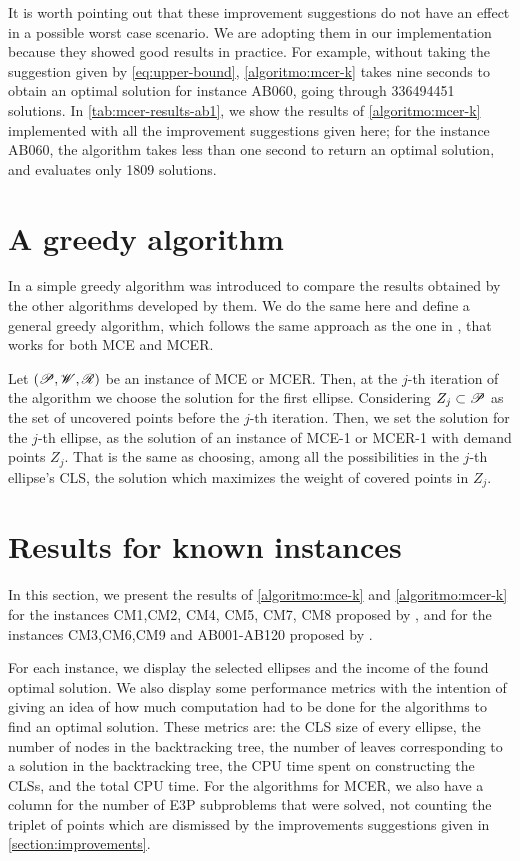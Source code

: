 It is worth pointing out that these improvement suggestions do not have an effect in a possible worst case scenario. We are adopting them in our implementation because they showed good results in practice.
For example, without taking the suggestion given by \autoref{eq:upper-bound}, \autoref{algoritmo:mcer-k} takes nine seconds to obtain an optimal solution for instance AB060, going through \num{336494451} solutions.
In \autoref{tab:mcer-results-ab1}, we show the results of \autoref{algoritmo:mcer-k} implemented with all the improvement suggestions given here; for the instance AB060, the algorithm takes less than one second to return an optimal solution, and evaluates only \num{1809} solutions.

\section{A greedy algorithm}

In  a simple greedy algorithm was introduced to compare the results obtained by the other algorithms developed by them. We do the same here and define a general greedy algorithm, which follows the same approach as the one in , that works for both MCE and MCER.

Let $(\mathscr{P}, \mathscr{W}, \mathscr{R})$ be an instance of MCE or MCER. Then, at the $j$-th iteration of the algorithm we choose the solution for the first ellipse. Considering $Z_j \subset \mathscr{P}$ as the set of uncovered points before the $j$-th iteration. Then, we set the solution for the $j$-th ellipse, as the solution of an instance of MCE-1 or MCER-1 with demand points $Z_j$.
That is the same as choosing, among all the possibilities in the $j$-th ellipse's CLS, the solution which maximizes the weight of covered points in $Z_j$.

\section{Results for known instances}

In this section, we present the results of \autoref{algoritmo:mce-k} and \autoref{algoritmo:mcer-k} for the instances CM1,CM2, CM4, CM5, CM7, CM8 proposed by , and for the instances CM3,CM6,CM9 and AB001-AB120 proposed by .

For each instance, we display the selected ellipses and the income of the found optimal solution. 
We also display some performance metrics with the intention of giving an idea of how much computation had to be done for the algorithms to find an optimal solution. These metrics are: 
the CLS size of every ellipse, the number of nodes in the backtracking tree, the number of leaves corresponding to a solution in the backtracking tree, the CPU time spent on constructing the CLSs, and the total CPU time.
For the algorithms for MCER, we also have a column for the number of E3P subproblems that were solved, not counting the triplet of points which are dismissed by the improvements suggestions given in \autoref{section:improvements}.


